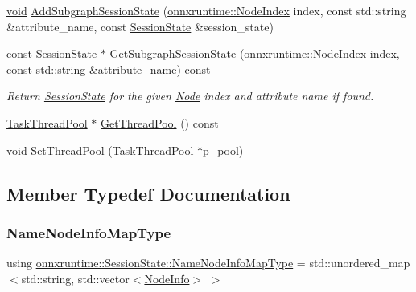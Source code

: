 \begin{DoxyCompactItemize}
\item 
\mbox{\hyperlink{mlasi_8h_a88f941d423cb2a819b70a1358982b1a6}{void}} \mbox{\hyperlink{classonnxruntime_1_1SessionState_ab47ad35c3d00dff1aab587b2bd1cb737}{Add\+Subgraph\+Session\+State}} (\mbox{\hyperlink{namespaceonnxruntime_af8773b5c12b5d8fd9292eb2e268df760}{onnxruntime\+::\+Node\+Index}} index, const std\+::string \&attribute\+\_\+name, const \mbox{\hyperlink{classonnxruntime_1_1SessionState}{Session\+State}} \&session\+\_\+state)
\item 
const \mbox{\hyperlink{classonnxruntime_1_1SessionState}{Session\+State}} $\ast$ \mbox{\hyperlink{classonnxruntime_1_1SessionState_a54dbfd28320e11bb9b2d8589712c9c38}{Get\+Subgraph\+Session\+State}} (\mbox{\hyperlink{namespaceonnxruntime_af8773b5c12b5d8fd9292eb2e268df760}{onnxruntime\+::\+Node\+Index}} index, const std\+::string \&attribute\+\_\+name) const
\begin{DoxyCompactList}\small\item\em Return \mbox{\hyperlink{classonnxruntime_1_1SessionState}{Session\+State}} for the given \mbox{\hyperlink{classonnxruntime_1_1Node}{Node}} index and attribute name if found. \end{DoxyCompactList}\item 
\mbox{\hyperlink{classonnxruntime_1_1TaskThreadPool}{Task\+Thread\+Pool}} $\ast$ \mbox{\hyperlink{classonnxruntime_1_1SessionState_a756fc2e2e8e3a50af56697a431b8869b}{Get\+Thread\+Pool}} () const
\item 
\mbox{\hyperlink{mlasi_8h_a88f941d423cb2a819b70a1358982b1a6}{void}} \mbox{\hyperlink{classonnxruntime_1_1SessionState_a78e8fcc1e3a7fc1f0d29b8c101c57fd3}{Set\+Thread\+Pool}} (\mbox{\hyperlink{classonnxruntime_1_1TaskThreadPool}{Task\+Thread\+Pool}} $\ast$p\+\_\+pool)
\end{DoxyCompactItemize}


\subsection{Member Typedef Documentation}
\mbox{\label{classonnxruntime_1_1SessionState_ae235b8dfb073b021d014a42b5dcc0072}} 
\subsubsection{\texorpdfstring{Name\+Node\+Info\+Map\+Type}{NameNodeInfoMapType}}
{\footnotesize\ttfamily using \mbox{\hyperlink{classonnxruntime_1_1SessionState_ae235b8dfb073b021d014a42b5dcc0072}{onnxruntime\+::\+Session\+State\+::\+Name\+Node\+Info\+Map\+Type}} =  std\+::unordered\+\_\+map$<$std\+::string, std\+::vector$<$\mbox{\hyperlink{structonnxruntime_1_1SessionState_1_1NodeInfo}{Node\+Info}}$>$ $>$}



